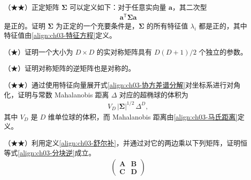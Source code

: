 \documentclass[../../main.tex]{subfiles}
\begin{document}
\begin{exercise}\label{exercise:ch03-14}
（★★）正定矩阵 $\boldsymbol{\Sigma}$ 可以定义如下：对于任意实向量 $\boldsymbol{a}$，其二次型
\begin{align*}
\boldsymbol{a}^{\mathsf{T}}\boldsymbol{\Sigma}\boldsymbol{a}
\end{align*}
是正的。证明 $\boldsymbol{\Sigma}$ 为正定的一个充要条件是，$\boldsymbol{\Sigma}$ 的所有特征值 $\lambda_i$ 都是正的，其中特征值由\eqref{align:ch03-特征方程}定义。
\end{exercise}

\begin{exercise}\label{exercise:ch03-15}
（★）证明一个大小为 $D\times D$ 的实对称矩阵具有 $D(D+1)/2$ 个独立的参数。
\end{exercise}

\begin{exercise}\label{exercise:ch03-16}
（★）证明对称矩阵的逆矩阵也是对称的。
\end{exercise}

\begin{exercise}\label{exercise:ch03-17}
（★★）通过使用特征向量展开式\eqref{align:ch03-协方差谱分解}对坐标系进行对角化，证明与常数 Mahalanobis 距离 $\Delta$ 对应的超椭球的体积为
\begin{align*}
V_{D}\,\lvert\boldsymbol{\Sigma}\rvert^{1/2}\,\Delta^{D},
\end{align*}
其中 $V_{D}$ 是 $D$ 维单位球的体积，而 Mahalanobis 距离由\eqref{align:ch03-马氏距离}定义。
\end{exercise}

\begin{exercise}\label{exercise:ch03-18}
（★★）利用定义\eqref{align:ch03-舒尔补}，并通过对它的两边乘以下列矩阵，证明恒等式\eqref{align:ch03-分块逆}成立。
\begin{align*}
\begin{pmatrix}\boldsymbol{A} & \boldsymbol{B}\\ \boldsymbol{C} & \boldsymbol{D}\end{pmatrix}
\end{align*}
\end{exercise}
\end{document}
